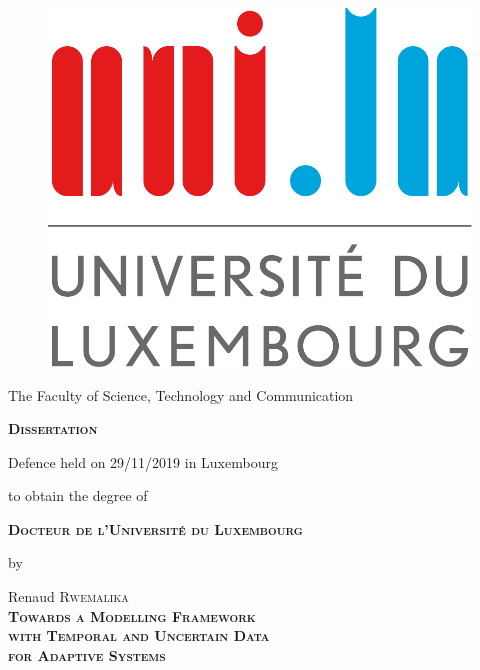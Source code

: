 \thispagestyle{empty}

\begin{figure}
    \centering
    \includegraphics[width=0.3\linewidth]{figures/logo/logoul.pdf}
    \label{fig:my_label}
\end{figure}

\begin{center}         
         \vspace{0.6cm}\noindent
         
         The Faculty of Science, Technology and Communication
         
         \vspace{1cm}\noindent
         {\LARGE \textbf{\textsc{Dissertation}}}
         
         \vspace{0.8cm}
         \noindent
         Defence held on 29/11/2019 in Luxembourg
         
         \vspace{0.5cm}\noindent
         to obtain the degree of
         
         \vspace{1.2cm}\noindent
         {\Large \textbf{\textsc{Docteur de l'Université du Luxembourg}}}

         \vspace{0.5cm}\noindent
         {\Large by}

         \vspace{0.5cm}\noindent
         {\Large Renaud \textsc{Rwemalika}}\\

         \vspace{1cm}\noindent
         {\LARGE \textbf{\textsc{Towards a Modelling Framework}}}\\[0.4cm] 
         {\LARGE \textbf{\textsc{ with Temporal and Uncertain Data}}}\\[0.4cm]
                  {\LARGE \textbf{\textsc{for Adaptive Systems}}}\\[0.4cm]
\end{center}

